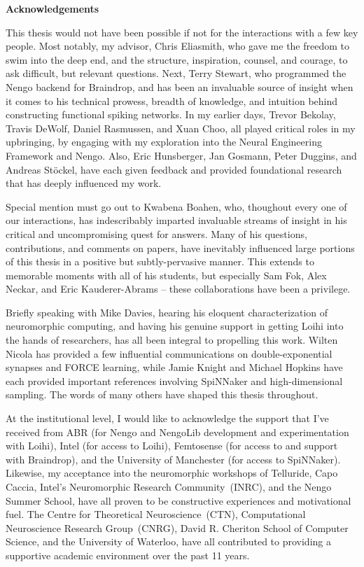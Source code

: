 {}
\begin{center}\textbf{Acknowledgements}\end{center}

This thesis would not have been possible if not for the interactions with a few key people.
Most notably, my advisor, Chris Eliasmith, who gave me the freedom to swim into the deep end, and the structure, inspiration, counsel, and courage, to ask difficult, but relevant questions.
Next, Terry Stewart, who programmed the Nengo backend for Braindrop, and has been an invaluable source of insight when it comes to his technical prowess, breadth of knowledge, and intuition behind constructing functional spiking networks.
In my earlier days, Trevor Bekolay, Travis DeWolf, Daniel Rasmussen, and Xuan Choo, all played critical roles in my upbringing, by engaging with my exploration into the Neural Engineering Framework and Nengo.
Also, Eric Hunsberger, Jan Gosmann, Peter Duggins, and Andreas St{\"o}ckel, have each given feedback and provided foundational research that has deeply influenced my work.

Special mention must go out to Kwabena Boahen, who, thoughout every one of our interactions, has indescribably imparted invaluable streams of insight in his critical and uncompromising quest for answers.
Many of his questions, contributions, and comments on papers, have inevitably influenced large portions of this thesis in a positive but subtly-pervasive manner.
This extends to memorable moments with all of his students, but especially Sam Fok, Alex Neckar, and Eric Kauderer-Abrams -- these collaborations have been a privilege.

Briefly speaking with Mike Davies, hearing his eloquent characterization of neuromorphic computing, and having his genuine support in getting Loihi into the hands of researchers, has all been integral to propelling this work.
Wilten Nicola has provided a few influential communications on double-exponential synapses and FORCE learning, while Jamie Knight and Michael Hopkins have each provided important references involving SpiNNaker and high-dimensional sampling.
The words of many others have shaped this thesis throughout.

At the institutional level, I would like to acknowledge the support that I've received from
ABR (for Nengo and NengoLib development and experimentation with Loihi),
Intel (for access to Loihi),
Femtosense (for access to and support with Braindrop),
and the University of Manchester (for access to SpiNNaker).
Likewise, my acceptance into the neuromorphic workshops of Telluride, Capo Caccia, Intel's Neuromorphic Research Community~(INRC), and the Nengo Summer School, have all proven to be constructive experiences and motivational fuel.
The Centre for Theoretical Neuroscience~(CTN), Computational Neuroscience Research Group~(CNRG), David R. Cheriton School of Computer Science, and the University of Waterloo, have all contributed to providing a supportive academic environment over the past 11 years.  

